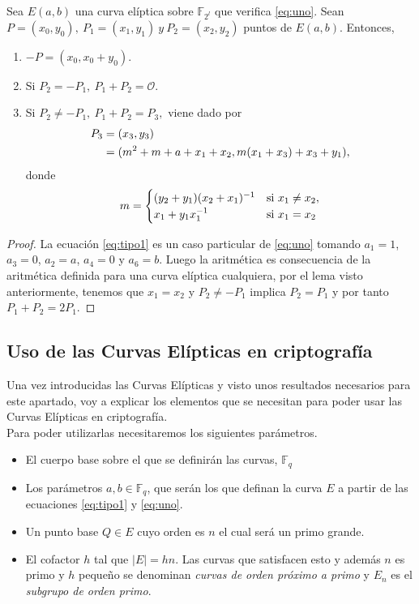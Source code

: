 \begin{proposicion}
	Sea $E(a,b)$ una curva elíptica sobre $\mathbb{F}_{2^l}$ que verifica \eqref{eq:uno}. Sean $P=(x_0,y_0),\: P_1=(x_1,y_1)\:y\:P_2=(x_2,y_2)$ puntos de $E(a,b)$. Entonces, 
	\begin{enumerate}
		\item $-P=(x_0,x_0+y_0)$.
		\item Si $P_2=-P_1,\: P_1+P_2=\mathcal{O}$.
		\item Si $P_2\neq-P_1,\:P_1+P_2=P_3,$ viene dado por
		\begin{equation}
			\begin{split}
					P_3 &=(x_3,y_3)\notag\\
						&=(m^2+m+a+x_1+x_2,m(x_1+x_3)+x_3+y_1)\notag,
			\end{split}
		\end{equation}
		donde 
		\begin{equation}
		  m =
			\begin{cases}
				(y_2+y_1)(x_2+x_1)^{-1} & \text{si } x_1\neq x_2, \\
				x_1+y_1x_1^{-1} & \text{si } x_1=x_2
			\end{cases}       
			\notag
		\end{equation}
	\end{enumerate}
\end{proposicion}
\begin{proof}
	La ecuación \eqref{eq:tipo1} es un caso particular de \eqref{eq:uno} tomando $a_1=1$, $a_3=0$, $a_2=a$, $a_4=0$ y $a_6=b$. Luego la aritmética es consecuencia de la aritmética definida para una curva elíptica cualquiera, por el lema visto anteriormente, tenemos que $x_1=x_2$ y $P_2\neq-P_1$ implica $P_2=P_1$ y por tanto $P_1+P_2=2P_1$.
\end{proof}

\subsection{Uso de las Curvas Elípticas en criptografía}
Una vez introducidas las Curvas Elípticas y visto unos resultados necesarios para este apartado, voy a explicar los elementos que se necesitan para poder usar las Curvas Elípticas en criptografía.\\
Para poder utilizarlas necesitaremos los siguientes parámetros.
\begin{itemize}
	\item El cuerpo base sobre el que se definirán las curvas, $\mathbb{F}_q$
	\item Los parámetros $a,b \in \mathbb{F}_q$, que serán los que definan la curva $E$ a partir de las ecuaciones \eqref{eq:tipo1} y \eqref{eq:uno}.
	\item Un punto base $Q\in E$ cuyo orden es $n$ el cual será un primo grande.
	\item El cofactor $h$ tal que $|E|=hn$. Las curvas que satisfacen esto y además $n$ es primo y $h$ pequeño se denominan \emph{curvas de orden próximo a primo} y $E_n$ es el \emph{subgrupo de orden primo}.	
\end{itemize}


